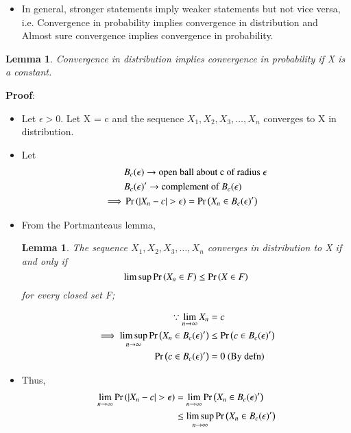 \documentclass[journal,12pt,twocolumn]{IEEEtran}
\newtheorem{lemma}[theorem]{Lemma}
\begin{document}
\begin{itemize}
    \item In general, stronger statements imply weaker statements but not vice versa, i.e. Convergence in probability implies convergence in distribution and Almost sure convergence implies convergence in probability.
\end{itemize}
\begin{lemma} Convergence in distribution implies convergence in probability if X is a constant.\end{lemma}
    \textbf{Proof}:
    \begin{itemize}
        \item Let $\epsilon > 0$. Let X = c and the sequence $X_1,X_2,X_3, \dots ,X_n$ converges to X in distribution.
        \item Let \begin{align}
            &B_c( \epsilon ) \rightarrow \text{open ball about c of radius } \epsilon \\
            &B_c( \epsilon)^\prime \rightarrow \text{complement of } B_c( \epsilon ) \\
            \implies &\pr{|X_n - c|>\epsilon} = \pr{X_ n\in B_c( \epsilon )^\prime}
        \end{align}
        \item From the Portmanteaus lemma,\begin{lemma}
             The sequence $X_1,X_2,X_3, \dots ,X_n$ converges in distribution to X if and only if \begin{equation}
                  \limsup \Pr\left(X_{n}\in F\right) \leq \Pr\left(X \in F\right)
             \end{equation} for every closed set F;
        \end{lemma} 
        \begin{align}
           \because \lim_{n \rightarrow \infty}X_n &= c \\
            \implies \limsup_{n \rightarrow \infty} \Pr\left(X_n \in B_c( \epsilon )^\prime\right) &\leq  \Pr\left(c \in B_c( \epsilon )^\prime\right) \\
            \Pr\left(c \in B_c( \epsilon )^\prime\right) &= 0 \text{ (By defn)}
        \end{align}
        \item Thus,
        \begin{align}
            \lim_{n \rightarrow \infty}\pr{|X_n - c|>\epsilon} &= \lim_{n \rightarrow \infty}\pr{X_n \in B_c( \epsilon )^\prime} \\
            & \leq \limsup_{n \rightarrow \infty}\pr{X_n \in B_c( \epsilon )^\prime} \\

\end{align}
\end{itemize}
\end{document}
